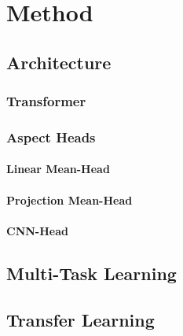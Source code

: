 \chapter{Method}
\label{ch:method}

\section{Architecture}

\subsection{Transformer}

\subsection{Aspect Heads}

\subsubsection{Linear Mean-Head}

\subsubsection{Projection Mean-Head}

\subsubsection{CNN-Head}

\section{Multi-Task Learning}

\section{Transfer Learning}


